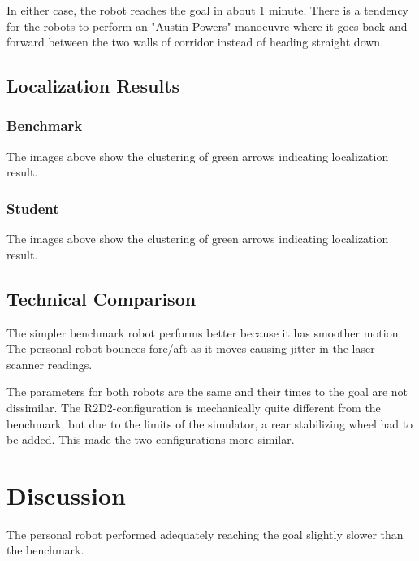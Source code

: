 \documentclass[10pt,journal,compsoc]{IEEEtran}
\begin{document}
In either case, the robot reaches the goal in about 1 minute. There is a tendency for the robots to perform an "Austin Powers" manoeuvre where it goes back and forward between the two walls of corridor instead of heading straight down.

\subsection{Localization Results}
\subsubsection{Benchmark}
The images above show the clustering of green arrows indicating localization result.
\subsubsection{Student}
The images above show the clustering of green arrows indicating localization result.

\subsection{Technical Comparison} %
The simpler benchmark robot performs better because it has smoother motion. The personal robot bounces fore/aft as it moves causing jitter in the laser scanner readings.

The parameters for both robots are the same and their times to the goal are not dissimilar. The R2D2-configuration is mechanically quite different from the benchmark, but due to the limits of the simulator, a rear stabilizing wheel had to be added. This made the two configurations more similar.

\section{Discussion}
The personal robot performed adequately reaching the goal slightly slower than the benchmark.
\end{document}
